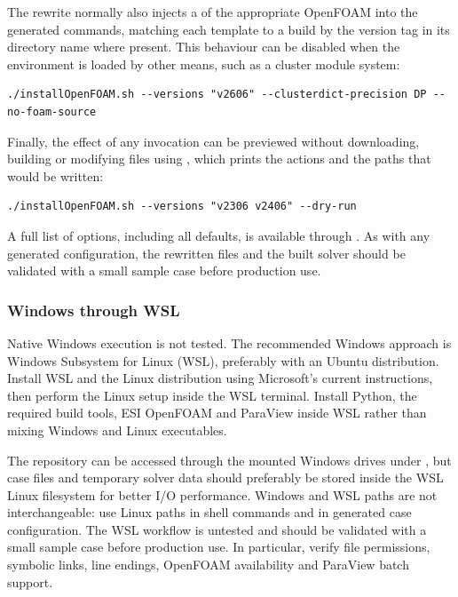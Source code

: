 The  rewrite normally also injects a  of the appropriate OpenFOAM  into the generated commands, matching each template to a build by the version tag in its directory name where present. This behaviour can be disabled when the environment is loaded by other means, such as a cluster module system:
\begin{lstlisting}
./installOpenFOAM.sh --versions "v2606" --clusterdict-precision DP --no-foam-source
\end{lstlisting}

Finally, the effect of any invocation can be previewed without downloading, building or modifying files using , which prints the actions and the paths that would be written:
\begin{lstlisting}
./installOpenFOAM.sh --versions "v2306 v2406" --dry-run
\end{lstlisting}

A full list of options, including all defaults, is available through . As with any generated configuration, the rewritten  files and the built solver should be validated with a small sample case before production use.

\subsubsection{Windows through WSL}

Native Windows execution is not tested. The recommended Windows approach is Windows Subsystem for Linux (WSL), preferably with an Ubuntu distribution. Install WSL and the Linux distribution using Microsoft's current instructions, then perform the Linux setup inside the WSL terminal. Install Python, the required build tools, ESI OpenFOAM and ParaView inside WSL rather than mixing Windows and Linux executables.

The repository can be accessed through the mounted Windows drives under , but case files and temporary solver data should preferably be stored inside the WSL Linux filesystem for better I/O performance. Windows and WSL paths are not interchangeable: use Linux paths in shell commands and in generated case configuration. The WSL workflow is untested and should be validated with a small sample case before production use. In particular, verify file permissions, symbolic links, line endings, OpenFOAM availability and ParaView batch support.

